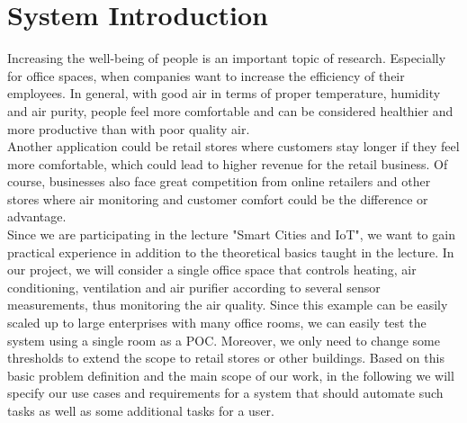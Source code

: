 \section{System Introduction}
Increasing the well-being of people is an important topic of research. Especially for office spaces, when companies want to increase the efficiency of their employees. In general, with good air in terms of proper temperature, humidity and air purity, people feel more comfortable and can be considered healthier and more productive than with poor quality air. \\
Another application could be retail stores where customers stay longer if they feel more comfortable, which could lead to higher revenue for the retail business. Of course, businesses also face great competition from online retailers and other stores where air monitoring and customer comfort could be the difference or advantage. \\
Since we are participating in the lecture "Smart Cities and IoT", we want to gain practical experience in addition to the theoretical basics taught in the lecture. In our project, we will consider a single office space that controls heating, air conditioning, ventilation and air purifier according to several sensor measurements, thus monitoring the air quality. Since this example can be easily scaled up to large enterprises with many office rooms, we can easily test the system using a single room as a POC. Moreover, we only need to change some thresholds to extend the scope to retail stores or other buildings. Based on this basic problem definition and the main scope of our work, in the following we will specify our use cases and requirements for a system that should automate such tasks as well as some additional tasks for a user.


